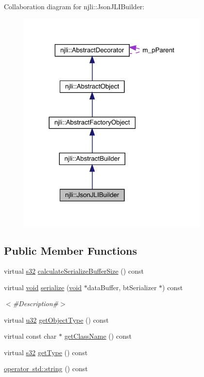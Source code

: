 Collaboration diagram for njli\+:\+:Json\+J\+L\+I\+Builder\+:\nopagebreak
\begin{figure}[H]
\begin{center}
\leavevmode
\includegraphics[width=273pt]{classnjli_1_1_json_j_l_i_builder__coll__graph}
\end{center}
\end{figure}
\subsection*{Public Member Functions}
\begin{DoxyCompactItemize}
\item 
virtual \mbox{\hyperlink{_util_8h_aa62c75d314a0d1f37f79c4b73b2292e2}{s32}} \mbox{\hyperlink{classnjli_1_1_json_j_l_i_builder_a840c24b183d787cd71ca8265a099d161}{calculate\+Serialize\+Buffer\+Size}} () const
\item 
virtual \mbox{\hyperlink{_thread_8h_af1e856da2e658414cb2456cb6f7ebc66}{void}} \mbox{\hyperlink{classnjli_1_1_json_j_l_i_builder_a2012b3b2f65e5729d7a06365b749c1e9}{serialize}} (\mbox{\hyperlink{_thread_8h_af1e856da2e658414cb2456cb6f7ebc66}{void}} $\ast$data\+Buffer, bt\+Serializer $\ast$) const
\begin{DoxyCompactList}\small\item\em $<$\#\+Description\#$>$ \end{DoxyCompactList}\item 
virtual \mbox{\hyperlink{_util_8h_a10e94b422ef0c20dcdec20d31a1f5049}{u32}} \mbox{\hyperlink{classnjli_1_1_json_j_l_i_builder_a82d8ed9acc042c7bc9c9a335120d8264}{get\+Object\+Type}} () const
\item 
virtual const char $\ast$ \mbox{\hyperlink{classnjli_1_1_json_j_l_i_builder_a673faf917817f3e3f4dd2215ce35857d}{get\+Class\+Name}} () const
\item 
virtual \mbox{\hyperlink{_util_8h_aa62c75d314a0d1f37f79c4b73b2292e2}{s32}} \mbox{\hyperlink{classnjli_1_1_json_j_l_i_builder_ab7b9d6fc279c1eeaf80f761ef77fb650}{get\+Type}} () const
\item 
\mbox{\hyperlink{classnjli_1_1_json_j_l_i_builder_a1c7f6f0eb380366a2ce04a008621b54b}{operator std\+::string}} () const
\end{DoxyCompactItemize}
